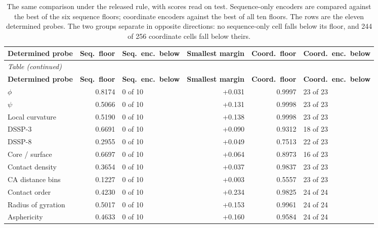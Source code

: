 \begingroup
\fontsize{7.5}{9.1}\selectfont
\setlength{\tabcolsep}{3pt}
\renewcommand{\arraystretch}{1.08}
\begin{longtable}{lrlrrl}
\caption{The same comparison under the released rule, with scores read on test. Sequence-only encoders are compared against the best of the six sequence floors; coordinate encoders against the best of all ten floors. The rows are the eleven determined probes. The two groups separate in opposite directions: no sequence-only cell falls below its floor, and 244 of 256 coordinate cells fall below theirs.}\label{tab:conditional_floor}\\
\toprule
\rowcolor{CompassLavender!32}
\textbf{Determined probe} & \textbf{Seq.\ floor} & \textbf{Seq.\ enc.\ below} & \textbf{Smallest margin} & \textbf{Coord.\ floor} & \textbf{Coord.\ enc.\ below} \\

\midrule
\endfirsthead
\multicolumn{6}{l}{\small\textit{Table \thetable{} (continued)}}\\
\toprule
\rowcolor{CompassLavender!32}
\textbf{Determined probe} & \textbf{Seq.\ floor} & \textbf{Seq.\ enc.\ below} & \textbf{Smallest margin} & \textbf{Coord.\ floor} & \textbf{Coord.\ enc.\ below} \\

\midrule
\endhead
\midrule
\endfoot
\bottomrule
\endlastfoot

$\phi$ & 0.8174 & 0 of 10 & +0.031 & 0.9997 & 23 of 23 \\
$\psi$ & 0.5066 & 0 of 10 & +0.131 & 0.9998 & 23 of 23 \\
Local curvature & 0.5190 & 0 of 10 & +0.138 & 0.9998 & 23 of 23 \\
DSSP-3 & 0.6691 & 0 of 10 & +0.090 & 0.9312 & 18 of 23 \\
DSSP-8 & 0.2955 & 0 of 10 & +0.049 & 0.7513 & 22 of 23 \\
Core / surface & 0.6697 & 0 of 10 & +0.064 & 0.8973 & 16 of 23 \\
Contact density & 0.3654 & 0 of 10 & +0.037 & 0.9837 & 23 of 23 \\
CA distance bins & 0.1227 & 0 of 10 & +0.003 & 0.5557 & 23 of 23 \\
Contact order & 0.4230 & 0 of 10 & +0.234 & 0.9825 & 24 of 24 \\
Radius of gyration & 0.5017 & 0 of 10 & +0.153 & 0.9961 & 24 of 24 \\
Asphericity & 0.4633 & 0 of 10 & +0.160 & 0.9584 & 24 of 24 \\

\end{longtable}
\endgroup
